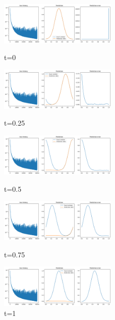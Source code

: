 \documentclass{article}
\begin{document}
\begin{figure}[!h]
    \centering
    \includegraphics[width=0.5\textwidth]{images/nsup1.png}
    \caption{t=0}

    \includegraphics[width=0.5\textwidth]{images/nsup2.png}
    \caption{t=0.25}

    \includegraphics[width=0.5\textwidth]{images/nsup3.png}
    \caption{t=0.5}

    \includegraphics[width=0.5\textwidth]{images/nsup4.png}
    \caption{t=0.75}

    \includegraphics[width=0.5\textwidth]{images/nsup5.png}
    \caption{t=1}
\end{figure} 
\end{document}
